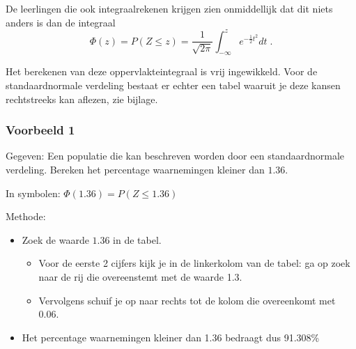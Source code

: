 \documentclass[a4paper,12pt, twoside]{article}
\begin{document}
\begin{center}
\end{center}

De leerlingen die ook integraalrekenen krijgen zien onmiddellijk dat dit niets anders is dan de integraal
$$\Phi(z)=P(Z\leq z)=\dfrac{1}{\sqrt{2\pi}}\int_{-\infty}^{z}e^{-\frac{1}{2}t^2}dt\;.$$

Het berekenen van deze oppervlakteintegraal is vrij ingewikkeld. Voor de standaardnormale verdeling bestaat er echter een tabel waaruit je deze kansen rechtstreeks kan aflezen, zie bijlage.

\subsubsection*{Voorbeeld 1}

Gegeven: Een populatie die kan beschreven worden door een standaardnormale verdeling. Bereken het percentage waarnemingen kleiner dan $1.36$.

In symbolen: $\Phi(1.36)=P(Z\leq 1.36)$

Methode:
\begin{itemize}
  \item Zoek de waarde $1.36$ in de tabel.
  \begin{itemize}
    \item Voor de eerste 2 cijfers kijk je in de linkerkolom van de tabel: ga op zoek naar de rij die overeenstemt met de waarde 1.3.
    \item Vervolgens schuif je op naar rechts tot de kolom die overeenkomt met 0.06.
  \end{itemize}
  \item Het percentage waarnemingen kleiner dan 1.36 bedraagt dus 91.308\%
\end{itemize}
\end{document}
